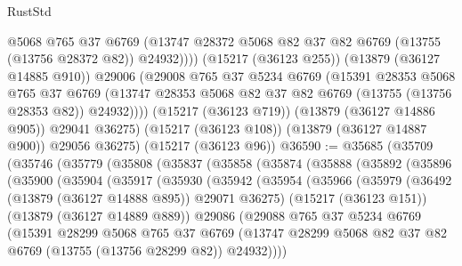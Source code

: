 \begin{lexlean}{RustStd}
\begin{coremodule}
                @5068
                @765
                @37
                @6769
                (@13747 @28372 @5068 @82 @37 @82 @6769 (@13755 (@13756 @28372 @82)) @24932))))
          (@15217 (@36123 @255))
          (@13879 (@36127 @14885 @910))
          @29006
          (@29008
            @765
            @37
            @5234
            @6769
            (@15391
              @28353
              @5068
              @765
              @37
              @6769
              (@13747 @28353 @5068 @82 @37 @82 @6769 (@13755 (@13756 @28353 @82)) @24932))))
        (@15217 (@36123 @719))
        (@13879 (@36127 @14886 @905))
        @29041
        @36275)
      (@15217 (@36123 @108))
      (@13879 (@36127 @14887 @900))
      @29056
      @36275)
    (@15217 (@36123 @96))
@36590 := @35685
    (@35709
      (@35746
        (@35779
          (@35808
            (@35837
              (@35858
                (@35874
                  (@35888
                    (@35892
                      (@35896
                        (@35900
                          (@35904
                            (@35917
                              (@35930
                                (@35942
                                  (@35954
                                    (@35966
                                      (@35979
                                        (@36492 (@13879 (@36127 @14888 @895)) @29071 @36275)
                                        (@15217 (@36123 @151))
                                        (@13879 (@36127 @14889 @889))
                                        @29086
                                        (@29088
                                          @765
                                          @37
                                          @5234
                                          @6769
                                          (@15391
                                            @28299
                                            @5068
                                            @765
                                            @37
                                            @6769
                                            (@13747
                                              @28299
                                              @5068
                                              @82
                                              @37
                                              @82
                                              @6769
                                              (@13755 (@13756 @28299 @82))
                                              @24932))))

\end{coremodule}
\end{lexlean}
